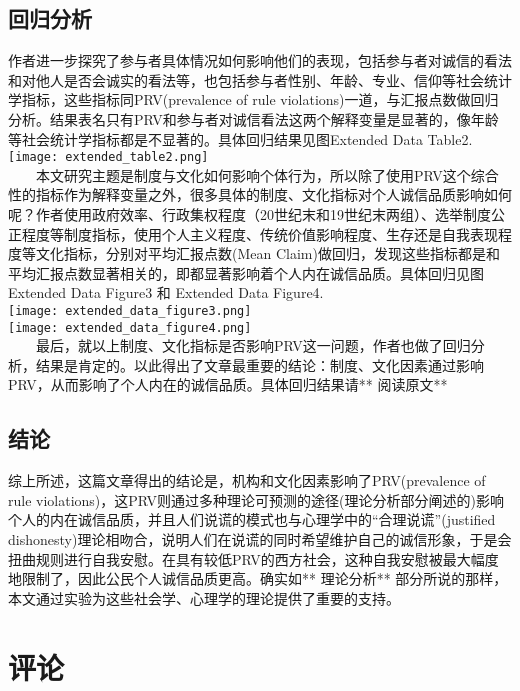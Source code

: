 \documentclass[11pt]{article}
\makeatletter
\def\maxwidth{\ifdim\Gin@nat@width>\linewidth\linewidth
    \else\Gin@nat@width\fi}
\let\Oldincludegraphics\includegraphics
\renewcommand{\includegraphics}[1]{\Oldincludegraphics[width=.8\maxwidth]{#1}}
\makeatother
\begin{document}
    \subsection{回归分析}\label{ux56deux5f52ux5206ux6790}

    作者进一步探究了参与者具体情况如何影响他们的表现，包括参与者对诚信的看法和对他人是否会诚实的看法等，也包括参与者性别、年龄、专业、信仰等社会统计学指标，这些指标同PRV(prevalence
of rule
violations)一道，与汇报点数做回归分析。结果表名只有PRV和参与者对诚信看法这两个解释变量是显著的，像年龄等社会统计学指标都是不显著的。具体回归结果见图Extended
Data Table2.\\
\texttt{[image: extended\_table2.png]}\\
　　本文研究主题是制度与文化如何影响个体行为，所以除了使用PRV这个综合性的指标作为解释变量之外，很多具体的制度、文化指标对个人诚信品质影响如何呢？作者使用政府效率、行政集权程度（20世纪末和19世纪末两组）、选举制度公正程度等制度指标，使用个人主义程度、传统价值影响程度、生存还是自我表现程度等文化指标，分别对平均汇报点数(Mean
Claim)做回归，发现这些指标都是和平均汇报点数显著相关的，即都显著影响着个人内在诚信品质。具体回归见图Extended
Data Figure3 和 Extended Data Figure4.\\
\texttt{[image: extended\_data\_figure3.png]}\\
\texttt{[image: extended\_data\_figure4.png]}\\
　　最后，就以上制度、文化指标是否影响PRV这一问题，作者也做了回归分析，结果是肯定的。以此得出了文章最重要的结论：制度、文化因素通过影响PRV，从而影响了个人内在的诚信品质。具体回归结果请**
阅读原文**

    \subsection{结论}\label{ux7ed3ux8bba}

    综上所述，这篇文章得出的结论是，机构和文化因素影响了PRV(prevalence of
rule
violations)，这PRV则通过多种理论可预测的途径(理论分析部分阐述的)影响个人的内在诚信品质，并且人们说谎的模式也与心理学中的``合理说谎''(justified
dishonesty)理论相吻合，说明人们在说谎的同时希望维护自己的诚信形象，于是会扭曲规则进行自我安慰。在具有较低PRV的西方社会，这种自我安慰被最大幅度地限制了，因此公民个人诚信品质更高。确实如**
理论分析**
部分所说的那样，本文通过实验为这些社会学、心理学的理论提供了重要的支持。

    \section{评论}\label{ux8bc4ux8bba}
\end{document}
